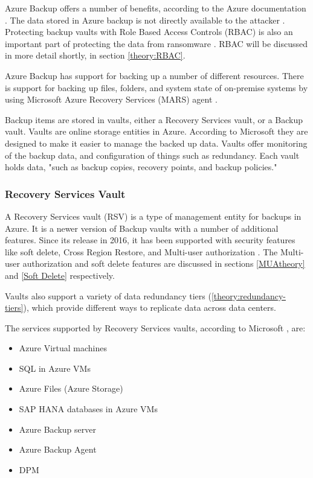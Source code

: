 Azure Backup offers a number of benefits, according to the Azure documentation \cite{v-amallick_what_nodate}.
The data stored in Azure backup is not directly available to the attacker \cite{terrylanfear_azure_nodate}. 
Protecting backup vaults with Role Based Access Controls (RBAC) is also an important part of protecting the data from ransomware \cite{v-amallick_faq_nodate}. 
RBAC will be discussed in more detail shortly, in section \ref{theory:RBAC}.

Azure Backup has support for backing up a number of different resources. There is support for backing up files, folders, and system state of on-premise systems by using Microsoft Azure Recovery Services (MARS) agent \cite{v-amallick_manage_nodate}.

Backup items are stored in vaults, either a Recovery Services vault, or a Backup vault. Vaults are online storage entities in Azure. According to Microsoft they are designed to make it easier to manage the backed up data. Vaults offer monitoring of the backup data, and configuration of things such as redundancy. Each vault holds data, "such as backup copies, recovery points, and backup policies." \cite{v-amallick_architecture_nodate}

\subsubsection{Recovery Services Vault} \label{theory:rsv}
A Recovery Services vault (RSV) is a type of management entity for backups in Azure.
It is a newer version of Backup vaults with a number of additional features. 
Since its release in 2016, it has been supported with security features like soft delete, Cross Region Restore, and Multi-user authorization \cite{v-amallick_overview_nodate-1}. 
The Multi-user authorization and soft delete features are discussed in sections \ref{MUAtheory} and \ref{Soft Delete} respectively.

Vaults also support a variety of data redundancy tiers (\ref{theory:redundancy-tiers}),
which provide different ways to replicate data across data centers.

The services supported by Recovery Services vaults, according to Microsoft \cite{v-amallick_overview_nodate-1}, are:
\begin{itemize}
    \item Azure Virtual machines
    \item SQL in Azure VMs
    \item Azure Files (Azure Storage)
    \item SAP HANA databases in Azure VMs
    \item Azure Backup server
    \item Azure Backup Agent
    \item DPM
\end{itemize} 

